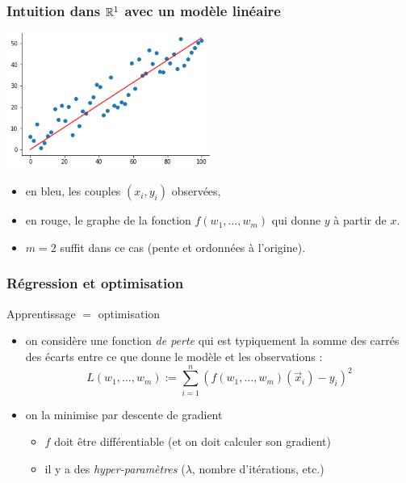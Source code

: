 \documentclass{beamer}
\newcommand{\R}{{\ensuremath\mathbb{R}}}
\begin{document}
\begin{frame}
  \frametitle{Intuition dans $\R^1$ avec un modèle linéaire}

  \begin{center}
      \includegraphics[width=0.5\textwidth]{linear-regression}    
  \end{center}

  \begin{itemize}
  \item en bleu, les couples $(x_i,y_i)$ observées,
  \item en rouge, le graphe de la fonction $f(w_1, \dots, w_m)$
    qui donne $y$ à partir de $x$.
  \item $m = 2$ suffit dans ce cas (pente
    et ordonnées à l'origine).
  \end{itemize}
\end{frame}

\begin{frame}
  \frametitle{Régression et optimisation}

  \begin{block}{Apprentissage $=$ optimisation}

    \begin{itemize}
    \item on considère une fonction \emph{de perte} qui
      est typiquement la somme des carrés des écarts entre ce que
      donne le modèle et les observations :
      \[ L(w_1, \dots, w_m) :=
      \sum_{i=1}^n (f(w_1, \dots, w_m)(\vec{x}_i) - y_i)^2 \]
    \item on la minimise par descente de gradient
      \begin{itemize}
      \item $f$ doit être différentiable (et on doit calculer son gradient)
      \item il y a des \emph{hyper-paramètres} ($\lambda$, nombre d'itérations, etc.)
      \end{itemize}
    \end{itemize}

  \end{block}
  
\end{frame}
\end{document}
